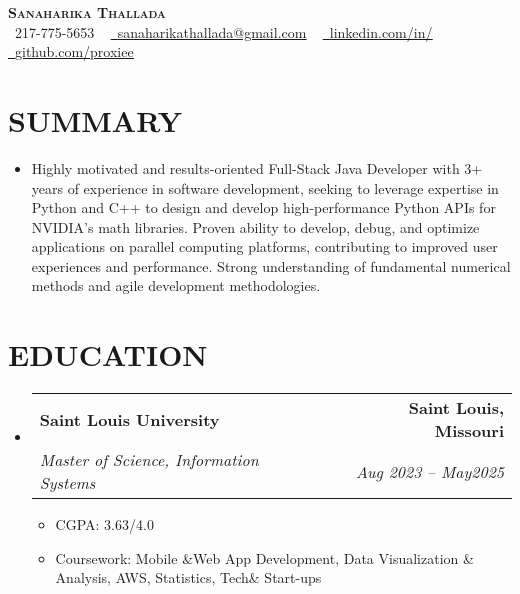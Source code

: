 \documentclass[letterpaper,11pt]{article}
\makeatletter
\newcommand{\resumeItem}[1]{\item\small{{#1 \vspace{-3pt}}}}
\newcommand{\resumeSubheading}[4]{\vspace{-2pt}\item\begin{tabular*}{0.97\textwidth}[t]{l@{\extracolsep{\fill}}r}\textbf{#1} & #2 \\ \textit{\small#3} & \textit{\small #4} \\ \end{tabular*}\vspace{-7pt}}
\newcommand{\resumeSubHeadingListStart}{\begin{itemize}[leftmargin=0.15in, label={}]}
\newcommand{\resumeSubHeadingListEnd}{\end{itemize}}
\newcommand{\resumeItemListStart}{\begin{itemize}}
\newcommand{\resumeItemListEnd}{\end{itemize}\vspace{-5pt}}
\makeatother
\begin{document}
\begin{center}
    \textbf{\Huge \scshape {\fontsize{15pt}{20pt}\selectfont Sanaharika Thallada}} \\ \vspace{1pt}
    \small \raisebox{-0.1\height}\faPhone\ 217-775-5653 ~ \href{mailto:sanaharikathallada@gmail.com}{\raisebox{-0.2\height}\faEnvelope\  \underline{sanaharikathallada@gmail.com}} ~ 
    \href{https://www.linkedin.com/in/yashwanthtirupati/}{\raisebox{-0.2\height}\faLinkedin\ \underline{linkedin.com/in/}} ~ 
    \href{https://github.com/proxiee}{\raisebox{-0.2\height}\faGithub\ \underline{github.com/proxiee}}
    \vspace{-8pt}
\end{center}

\section{{\fontsize{9pt}{20pt}\selectfont \textbf{SUMMARY}}}\resumeSubHeadingListStart
\resumeItem{Highly motivated and results-oriented Full-Stack Java Developer with 3+ years of experience in software development, seeking to leverage expertise in Python and C++ to design and develop high-performance Python APIs for NVIDIA's math libraries.  Proven ability to develop, debug, and optimize applications on parallel computing platforms, contributing to improved user experiences and performance.  Strong understanding of fundamental numerical methods and agile development methodologies.}
\resumeSubHeadingListEnd\vspace{-18pt}
\section{{\fontsize{9pt}{20pt}\selectfont \textbf{EDUCATION}}}\resumeSubHeadingListStart
\resumeSubheading{Saint Louis University}{\textbf{Saint Louis, Missouri}}{Master of Science, Information Systems}{Aug 2023 – May2025}
\resumeItemListStart
\resumeItem{CGPA: 3.63/4.0}
\resumeItem{Coursework: Mobile \&Web App Development, Data Visualization \& Analysis, AWS, Statistics, Tech\& Start-ups}
\resumeItemListEnd
\resumeSubHeadingListEnd\vspace{-18pt}
\end{document}
